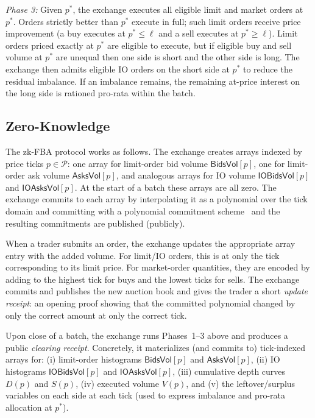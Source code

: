 \documentclass[runningheads]{llncs}
\begin{document}
\emph{Phase 3:} Given $p^*$, the exchange executes all eligible limit and market orders at $p^*$. Orders strictly better than $p^*$ execute in full; such limit orders receive price improvement (a buy executes at $p^*\le \ell$ and a sell executes at $p^*\ge \ell$). Limit orders priced exactly at $p^*$ are eligible to execute, but if eligible buy and sell volume at $p^*$ are unequal then one side is short and the other side is long. The exchange then admits eligible IO orders on the short side at $p^*$ to reduce the residual imbalance. If an imbalance remains, the remaining at-price interest on the long side is rationed pro-rata within the batch.

\subsection{Zero-Knowledge} 

The zk-FBA protocol works as follows. The exchange creates arrays indexed by price ticks $p\in\mathcal{P}$: one array for limit-order bid volume $\textsf{BidsVol}[p]$, one for limit-order ask volume $\textsf{AsksVol}[p]$, and analogous arrays for IO volume $\textsf{IOBidsVol}[p]$ and $\textsf{IOAsksVol}[p]$. At the start of a batch these arrays are all zero. The exchange commits to each array by interpolating it as a polynomial over the tick domain and committing with a polynomial commitment scheme~\cite{KZG10} and the resulting commitments are published (publicly).

When a trader submits an order, the exchange updates the appropriate array entry with the added volume. For limit/IO orders, this is at only the tick corresponding to its limit price. For market-order quantities, they are encoded by adding to the highest tick for buys and the lowest ticks for sells. The exchange commits and publishes the new auction book and gives the trader a short \emph{update receipt}: an opening proof showing that the committed polynomial changed by only the correct amount at only the correct tick.

Upon close of a batch, the exchange runs Phases~1--3 above and produces a public \emph{clearing receipt}. Concretely, it materializes (and commits to) tick-indexed arrays for: (i) limit-order histograms $\textsf{BidsVol}[p]$ and $\textsf{AsksVol}[p]$, (ii) IO histograms $\textsf{IOBidsVol}[p]$ and $\textsf{IOAsksVol}[p]$, (iii) cumulative depth curves $D(p)$ and $S(p)$, (iv) executed volume $V(p)$, and (v) the leftover/surplus variables on each side at each tick (used to express imbalance and pro-rata allocation at $p^*$).
\end{document}
